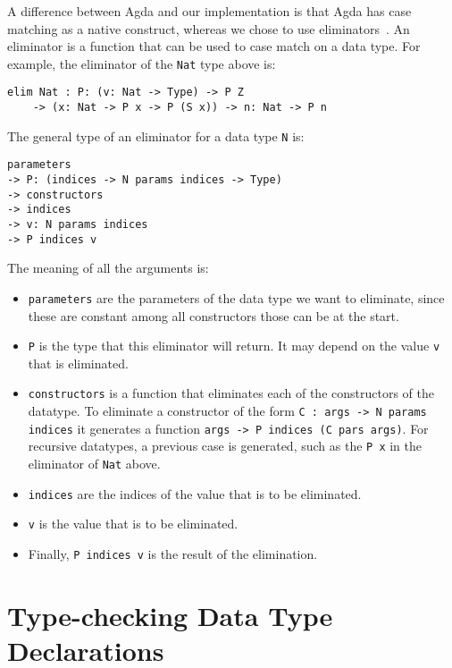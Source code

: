 A difference between Agda and our implementation is that Agda has case matching as a native construct, whereas we chose to use eliminators~\cite{eliminators}. An eliminator is a function that can be used to case match on a data type. For example, the eliminator of the \verb|Nat| type above is:
\begin{lstlisting}
elim Nat : P: (v: Nat -> Type) -> P Z 
	-> (x: Nat -> P x -> P (S x)) -> n: Nat -> P n
\end{lstlisting}

The general type of an eliminator for a data type \verb|N| is:
\begin{lstlisting}
parameters 
-> P: (indices -> N params indices -> Type) 
-> constructors
-> indices
-> v: N params indices
-> P indices v
\end{lstlisting}
The meaning of all the arguments is:
\begin{itemize}
	\item \verb|parameters| are the parameters of the data type we want to eliminate, since these are constant among all constructors those can be at the start.
	\item \verb|P| is the type that this eliminator will return. It may depend on the value \verb|v| that is eliminated.
	\item \verb|constructors| is a function that eliminates each of the constructors of the datatype. To eliminate a constructor of the form \verb|C : args -> N params indices| it generates a function \verb|args -> P indices (C pars args)|. For recursive datatypes, a previous case is generated, such as the \verb|P x| in the eliminator of \verb|Nat| above.
	\item \verb|indices| are the indices of the value that is to be eliminated.
	\item \verb|v| is the value that is to be eliminated.
	\item Finally, \verb|P indices v| is the result of the elimination.
\end{itemize}

\section{Type-checking Data Type Declarations}
\label{ch:datatypes:typechecking}

